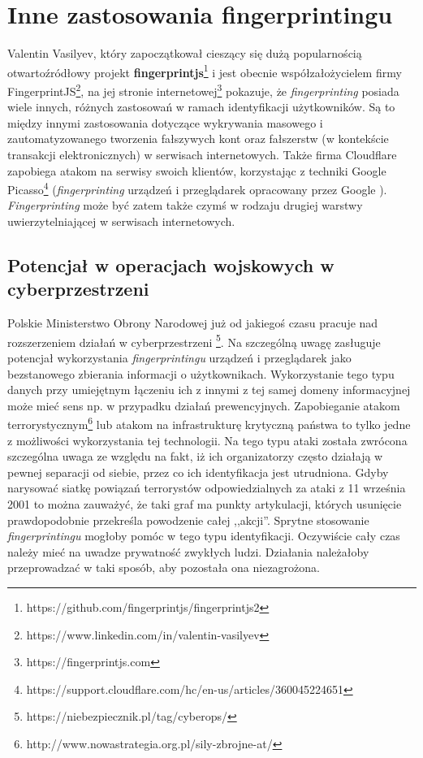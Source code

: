 \section{Inne zastosowania fingerprintingu}
Valentin Vasilyev, który zapoczątkował cieszący się dużą popularnością
otwartoźródłowy projekt
\textbf{fingerprintjs}\footnote{https://github.com/fingerprintjs/fingerprintjs2}
i jest obecnie współzałożycielem firmy
FingerprintJS\footnote{https://www.linkedin.com/in/valentin-vasilyev}, na jej
stronie internetowej\footnote{https://fingerprintjs.com} pokazuje, że
\emph{fingerprinting} posiada wiele innych, różnych zastosowań w ramach
identyfikacji użytkowników. Są to między innymi zastosowania dotyczące
wykrywania masowego i zautomatyzowanego tworzenia fałszywych kont oraz
fałszerstw (w kontekście transakcji elektronicznych) w serwisach internetowych.
Także firma Cloudflare zapobiega atakom na serwisy swoich klientów, korzystając
z techniki Google
Picasso\footnote{https://support.cloudflare.com/hc/en-us/articles/360045224651}
(\emph{fingerprinting} urządzeń i przeglądarek opracowany przez Google
\cite{45581}). \emph{Fingerprinting} może być zatem także czymś w rodzaju
drugiej warstwy uwierzytelniającej w serwisach internetowych.

\subsection{Potencjał w operacjach wojskowych w cyberprzestrzeni}
Polskie Ministerstwo Obrony Narodowej już od jakiegoś czasu pracuje nad
rozszerzeniem działań w cyberprzestrzeni
\footnote{https://niebezpiecznik.pl/tag/cyberops/}. Na szczególną uwagę
zasługuje potencjał wykorzystania \emph{fingerprintingu} urządzeń i przeglądarek
jako bezstanowego zbierania informacji o użytkownikach. Wykorzystanie tego typu
danych przy umiejętnym łączeniu ich z innymi z tej samej domeny informacyjnej
może mieć sens np. w przypadku działań prewencyjnych. Zapobieganie atakom
terrorystycznym\footnote{http://www.nowastrategia.org.pl/sily-zbrojne-at/} lub
atakom na infrastrukturę krytyczną państwa to tylko jedne z możliwości
wykorzystania tej technologii. Na tego typu ataki została zwrócona szczególna
uwaga ze względu na fakt, iż ich organizatorzy często działają w pewnej
separacji od siebie, przez co ich identyfikacja jest utrudniona. Gdyby narysować
siatkę powiązań terrorystów odpowiedzialnych za ataki z 11 września 2001 to
można zauważyć, że taki graf ma punkty artykulacji, których usunięcie
prawdopodobnie przekreśla powodzenie całej ,,akcji''. Sprytne stosowanie
\emph{fingerprintingu} mogłoby pomóc w tego typu identyfikacji. Oczywiście cały
czas należy mieć na uwadze prywatność zwykłych ludzi. Działania należałoby
przeprowadzać w taki sposób, aby pozostała ona niezagrożona.

